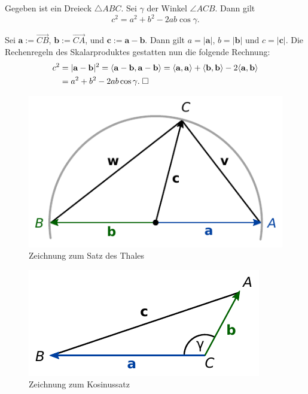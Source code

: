 \begin{Satz}[Kosinussatz]\newlinefirst
Gegeben ist ein Dreieck $\triangle ABC$. Sei $\gamma$ der
Winkel $\angle ACB$. Dann gilt
\[c^2=a^2+b^2-2ab\cos\gamma.\]
\end{Satz}
\begin{Beweis}
Sei $\mathbf a := \overrightarrow{CB}$,
$\mathbf b := \overrightarrow{CA}$,
und $\mathbf c := \mathbf a-\mathbf b$.
Dann gilt $a=|\mathbf a|$, $b=|\mathbf b|$ und $c=|\mathbf c|$.
Die Rechenregeln des Skalarproduktes gestatten nun die
folgende Rechnung:
\begin{align}
c^2 &= |\mathbf a-\mathbf b|^2
= \langle\mathbf a-\mathbf b,\mathbf a-\mathbf b\rangle
= \langle\mathbf a,\mathbf a\rangle
+ \langle\mathbf b,\mathbf b\rangle
- 2\langle\mathbf a,\mathbf b\rangle\\
&= a^2+b^2-2ab\cos\gamma.\;\square
\end{align}
\end{Beweis}

\begin{figure}[b!]
\centering
\includegraphics{img/Thales.pdf}
\caption{Zeichnung zum Satz des Thales}
\end{figure}

\begin{figure}[b!]
\centering
\includegraphics{img/Kosinussatz.pdf}
\caption{Zeichnung zum Kosinussatz}
\end{figure}

